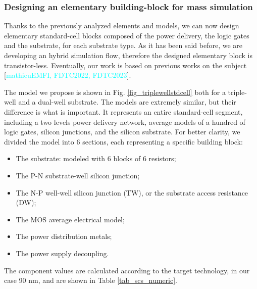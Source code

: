 		\subsubsection{Designing an elementary building-block for mass simulation}
		Thanks to the previously analyzed elements and models, we can now design elementary standard-cell blocks composed of the power delivery, the logic gates and the substrate, for each substrate type.
		As it has been said before, we are developing an hybrid simulation flow, therefore the designed elementary block is transistor-less.
		Eventually, our work is based on previous works on the subject [\textcolor{cyan}{mathieuEMFI, FDTC2022, FDTC2023}].
		
		
		
		The model we propose is shown in Fig. \ref{fig_triplewellstdcell} both for a triple-well and a dual-well substrate.
		The models are extremely similar, but their difference is what is important.
		It represents an entire standard-cell segment, including a two levels power delivery network, average models of a hundred of logic gates, silicon junctions, and the silicon substrate.
		For better clarity, we divided the model into 6 sections, each representing a specific building block:
		\begin{itemize}
			\item {} The substrate: modeled with 6 blocks of 6 resistors;
			\item {} The P-N substrate-well silicon junction;
			\item {} The N-P well-well silicon junction (TW), or the substrate access resistance (DW);
			\item {}  The MOS average electrical model;
			\item {}  The power distribution metals;
			\item {} The power supply decoupling.
		\end{itemize}
		
		The component values are calculated according to the target technology, in our case 90 nm, and are shown in Table \ref{tab_scs_numeric}.
		
